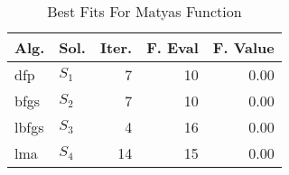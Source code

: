 \begin{table}[H]
\centering
\caption{Best Fits For Matyas Function}
\label{solutions:matyas}
\begin{tabular}{llrrr}
\toprule
 Alg. &    Sol. &  Iter. &  F. Eval &  F. Value \\
\midrule
  dfp & $S_{1}$ &      7 &       10 &      0.00 \\
 bfgs & $S_{2}$ &      7 &       10 &      0.00 \\
lbfgs & $S_{3}$ &      4 &       16 &      0.00 \\
  lma & $S_{4}$ &     14 &       15 &      0.00 \\
\bottomrule
\end{tabular}
\end{table}
